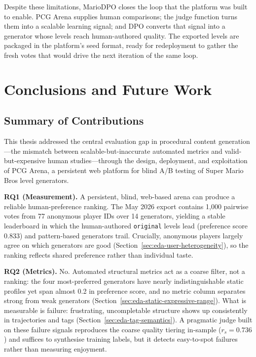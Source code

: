 \documentclass[shortabstract, mgr, english]{iithesis}
\begin{document}
Despite these limitations, MarioDPO closes the loop that the platform was
built to enable. PCG Arena supplies human comparisons; the judge function turns
them into a scalable learning signal; and DPO converts that signal into a
generator whose levels reach human-authored quality. The exported levels are
packaged in the platform's seed format, ready for redeployment to gather the
fresh votes that would drive the next iteration of the same loop.


\chapter{Conclusions and Future Work}
\label{ch:conclusions}


\section{Summary of Contributions}
\label{sec:conc-contributions}

This thesis addressed the central evaluation gap in procedural
content generation---the mismatch between scalable-but-inaccurate automated
metrics and valid-but-expensive human studies---through the design,
deployment, and exploitation of PCG Arena, a persistent web platform for blind
A/B testing of Super Mario Bros level generators.

\textbf{RQ1 (Measurement).} A persistent, blind, web-based arena can
produce a reliable human-preference ranking. The May 2026 export contains
1,000 pairwise votes from 77 anonymous player IDs over 14 generators, yielding
a stable leaderboard in which the human-authored \texttt{original} levels lead
(preference score 0.833) and pattern-based generators trail. Crucially,
anonymous players largely agree on which generators are good
(Section~\ref{sec:eda-user-heterogeneity}), so the ranking reflects shared
preference rather than individual taste. 

\textbf{RQ2 (Metrics).} No. Automated structural metrics act as a
coarse filter, not a ranking: the four most-preferred generators have nearly
indistinguishable static profiles yet span almost 0.2 in preference score, and
no metric column separates strong from weak generators
(Section~\ref{sec:eda-static-expressive-range}). What is measurable is
failure: frustrating, uncompletable structure shows up consistently in
trajectories and tags (Section~\ref{sec:eda-tag-semantics}). A pragmatic judge
built on these failure signals reproduces the coarse quality tiering in-sample
($r_s = 0.736$) and suffices to synthesise training labels, but it detects
easy-to-spot failures rather than measuring enjoyment.
\end{document}

